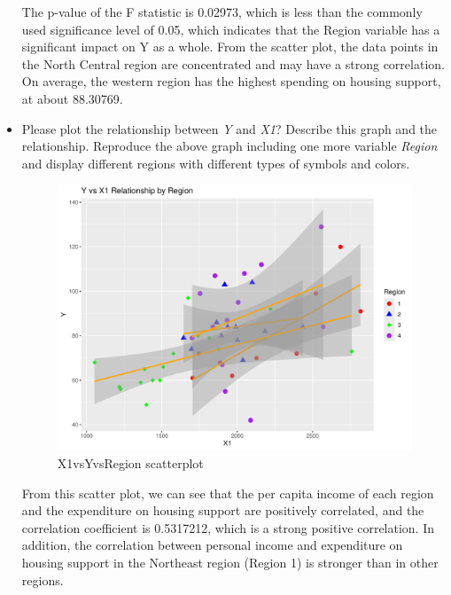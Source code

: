 \documentclass[12pt,letterpaper]{article}
\begin{document}
\begin{itemize}
\begin{figure}[h!]
\end{figure}
\vspace{10cm}
The p-value of the F statistic is 0.02973, which is less than the commonly used significance level of 0.05, which indicates that the Region variable has a significant impact on Y as a whole. From the scatter plot, the data points in the North Central region are concentrated and may have a strong correlation. On average, the western region has the highest spending on housing support, at about 88.30769.\\
\item
Please plot the relationship between \emph{Y} and \emph{X1}? Describe this graph and the relationship. Reproduce the above graph including one more variable \emph{Region} and display different regions with different types of symbols and colors.

\vspace{1cm}
\begin{figure}[h!]\centering
	\caption{\footnotesize X1vsYvsRegion scatterplot}
	\label{fig:X1vsY_Region}
	\includegraphics[width=.75\textwidth]{X1vsY_Region_scatterplot.pdf}
\end{figure}
From this scatter plot, we can see that the per capita income of each region and the expenditure on housing support are positively correlated, and the correlation coefficient is 0.5317212, which is a strong positive correlation. In addition, the correlation between personal income and expenditure on housing support in the Northeast region (Region 1) is stronger than in other regions.\\
\end{itemize}
\end{document}
